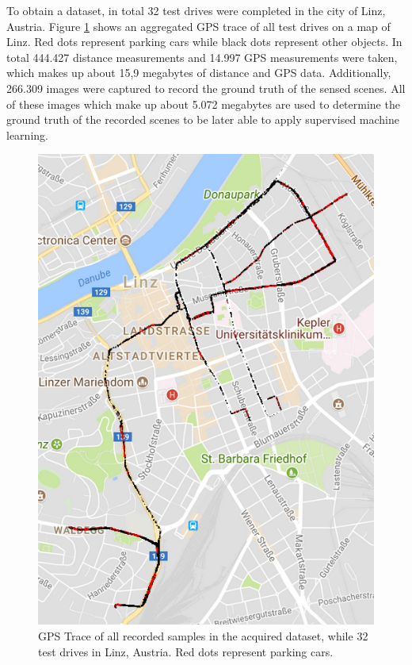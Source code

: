 To obtain a dataset, in total 32 test drives were completed in the city of Linz, Austria. Figure \ref{fig:gps_locations_dataset} shows an aggregated GPS trace of all test drives on a map of Linz. Red dots represent parking cars while black dots represent other objects. In total 444.427 distance measurements and 14.997 GPS measurements were taken, which makes up about 15,9 megabytes of distance and GPS data. 
Additionally, 266.309 images were captured to record the ground truth of the sensed scenes. All of these images which make up about 5.072 megabytes are used to determine the ground truth of the recorded scenes to be later able to apply supervised machine learning.



\begin{figure}
	\centering
	\includegraphics{img/gps_data_recorded_data_parking_spaces.PNG}
	\caption{GPS Trace of all recorded samples in the acquired dataset, while 32 test drives in Linz, Austria. Red dots represent parking cars.}
	\label{fig:gps_locations_dataset}
\end{figure}




